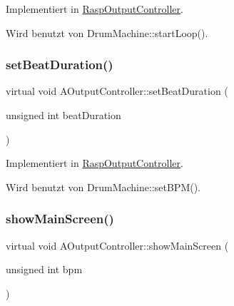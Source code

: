 Implementiert in \hyperlink{class_rasp_output_controller_afce87d510c0564567e4250b22639d5e0}{Rasp\+Output\+Controller}.



Wird benutzt von Drum\+Machine\+::start\+Loop().

\mbox{\label{class_a_output_controller_ac685432fc57d2441ecb548386554d2c9}} 
\subsubsection{\texorpdfstring{set\+Beat\+Duration()}{setBeatDuration()}}
{\footnotesize\ttfamily virtual void A\+Output\+Controller\+::set\+Beat\+Duration (\begin{DoxyParamCaption}\item[{unsigned int}]{beat\+Duration }\end{DoxyParamCaption})\hspace{0.3cm}{\ttfamily [pure virtual]}}



Implementiert in \hyperlink{class_rasp_output_controller_a5fd551f1aba056356befd71e5bff23f1}{Rasp\+Output\+Controller}.



Wird benutzt von Drum\+Machine\+::set\+B\+P\+M().

\mbox{\label{class_a_output_controller_ace7df9de71110b3615156b9bd06a9349}} 
\subsubsection{\texorpdfstring{show\+Main\+Screen()}{showMainScreen()}}
{\footnotesize\ttfamily virtual void A\+Output\+Controller\+::show\+Main\+Screen (\begin{DoxyParamCaption}\item[{unsigned int}]{bpm }\end{DoxyParamCaption})\hspace{0.3cm}{\ttfamily [pure virtual]}}




